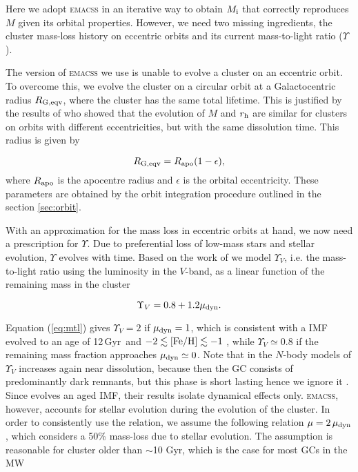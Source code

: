 \documentclass[useAMS,usenatbib,fleqn]{mnras}
\newcommand{\Mi}{M_{\rm i}}
\newcommand{\rh}{r_{\rm h}}
\newcommand{\gyr}{{\rm Gyr}}
\newcommand{\feh}{\[Fe/H\]}
\newcommand{\rapo}{R_{\rm apo}}
\newcommand{\mud}{\mu_{\rm dyn}}
\newcommand{\comm}[1]{#1}
\def\feh{{\rm [Fe/H]}}
\begin{document}
Here we adopt \textsc{emacss} in an iterative way to obtain $\Mi$ that correctly
reproduces $M$ given its orbital properties. However, we need two missing
ingredients, the cluster mass-loss history on eccentric orbits and its current
mass-to-light ratio ($\Upsilon$).

\comm{The version of \textsc{emacss} we use} is unable to evolve a cluster on an
eccentric orbit. To overcome this, we evolve the cluster on a circular orbit at
a Galactocentric radius $R_{\rm G,eqv}$, where the cluster has the same
total lifetime.  \comm{This is justified by the results of
\citet{2016MNRAS.455..596C} who  showed that the evolution of $M$ and $\rh$ are
similar for clusters on orbits with different eccentricities, but with the same
dissolution time.} This radius is given by \citep{Baumgardt03}

\begin{equation}
    \label{eq:eqvrad}
    R_{\rm G,eqv} = \rapo(1-\epsilon),
\end{equation}
where $\rapo$ is the apocentre radius and $\epsilon$ is the orbital
eccentricity.  These parameters are obtained by the orbit integration procedure
outlined in the section \ref{sec:orbit}.

With an approximation for the mass loss in eccentric orbits at hand, we now need
a prescription for $\Upsilon$. Due to preferential loss of low-mass stars and
stellar evolution, $\Upsilon$ evolves with time. Based on the work of
\citet{Anders09} we model $\Upsilon_V$, i.e. the mass-to-light ratio using the
luminosity in the $V$-band, as a linear function of \comm{the remaining mass in
the cluster}

\begin{equation}
    \label{eq:mtl}
    \Upsilon_{V} = 0.8 + 1.2\mud .
\end{equation}

Equation (\ref{eq:mtl}) gives $\Upsilon_V = 2$ if $\mud=1$, which is consistent
with a \citet{Kroupa01} IMF evolved to an age of 12\,\gyr\ and
$-2\lesssim\feh\lesssim-1$
\citep[e.g.][]{2003MNRAS.344.1000B,2010ApJ...712..833C}, while
$\Upsilon_V\simeq0.8$ if the remaining mass fraction approaches $\mud\simeq0$.
Note that in the $N$-body models of \citet{Anders09} $\Upsilon_V$ increases
again  near dissolution, because then the GC consists of predominantly dark
remnants, but this phase is short lasting hence we ignore it \citep[but we note
that NGC\,6535 may be in this phase,][]{2015ApJ...815...86H}. \comm{Since
\citet{Anders09} evolves an aged IMF, their results isolate dynamical effects
only.} \textsc{emacss}, \comm{however, accounts for stellar evolution during the
evolution of the cluster. In order to consistently use the \citet{Anders09}
relation, we assume the following relation $\mu = 2\,\mud$, which considers a
50\% mass-loss due to stellar evolution. The assumption is reasonable for
cluster older than $\sim$10 Gyr, which is the case for most GCs in the MW}
\end{document}
